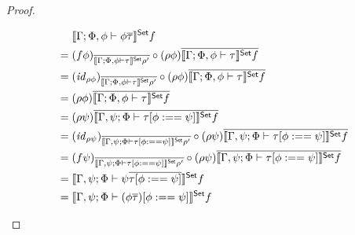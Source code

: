 \documentclass[acmsmall,review,anonymous]{acmart}
\theoremstyle{definition}
\renewcommand{\id}{\mathit{id}}
\begin{document}
\begin{proof}
\begin{itemize}
    \begin{align*}
         & \setsem{\Gamma; \Phi, \phi \vdash \phi \ol\tau} f \\
      = \; & (f \phi)_{\ol{\setsem{\Gamma; \Phi, \phi \vdash \tau} \rho'}} 
              \circ (\rho \phi) \ol{\setsem{\Gamma; \Phi, \phi \vdash \tau} f} \\
      = \; & (\id_{\rho \phi})_{\ol{\setsem{\Gamma; \Phi, \phi \vdash \tau} \rho'}} 
              \circ (\rho \phi) \ol{\setsem{\Gamma; \Phi, \phi \vdash \tau} f} \\
      = \; & (\rho \phi) \ol{\setsem{\Gamma; \Phi, \phi \vdash \tau} f} \\
      = \; & (\rho \psi) \ol{\setsem{\Gamma, \psi; \Phi \vdash \tau[\phi :== \psi]} f} \\
      = \; & (\id_{\rho \psi})_{\ol{\setsem{\Gamma, \psi; \Phi \vdash \tau[\phi :== \psi]} \rho'}}
              \circ (\rho \psi) \ol{\setsem{\Gamma, \psi; \Phi \vdash \tau[\phi :== \psi]} f} \\
      = \; & (f \psi)_{\ol{\setsem{\Gamma, \psi; \Phi \vdash \tau[\phi :== \psi]} \rho'}}
              \circ (\rho \psi) \ol{\setsem{\Gamma, \psi; \Phi \vdash \tau[\phi :== \psi]} f} \\
      = \; & \setsem{\Gamma, \psi; \Phi \vdash \psi \ol{\tau[\phi :== \psi]}} f \\
      = \; & \setsem{\Gamma, \psi; \Phi \vdash (\phi \ol\tau) [\phi :== \psi]} f
    \end{align*}


\end{itemize}
\end{proof}
\end{document}
